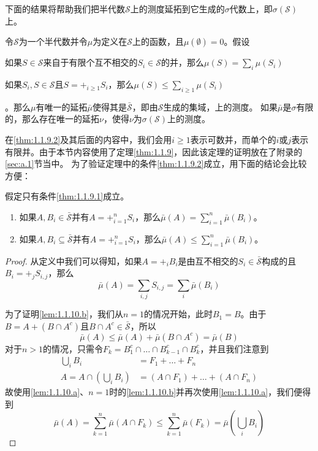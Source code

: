 \documentclass[main.tex]{subfiles}
\begin{document}
下面的结果将帮助我们把半代数\(\mathcal{S}\)上的测度延拓到它生成的\(\sigma\)代数上，即\(\sigma(\mathcal{S})\)上。
\begin{theorem} \label{thm:1.1.9}
	令\(\mathcal{S}\)为一个半代数并令\(\mu\)为定义在\(\mathcal{S}\)上的函数，且\(\mu(\emptyset) = 0\)。假设\begin{enumerate*}
		\item \label{thm:1.1.9.1} 如果\(S \in \mathcal{S}\)来自于有限个互不相交的\(S_i \in \mathcal{S}\)的并，那么\(\mu(S) = \sum_i \mu(S_i)\)
		\item \label{thm:1.1.9.2} 如果\(S_i, S \in \mathcal{S}\)且\(S = +_{i \geq 1} S_i\)，那么\(\mu(S) \leq \sum_{i \geq 1} \allowbreak\mu(S_i)\)
	\end{enumerate*}。那么\(\mu\)有唯一的延拓\(\bar{\mu}\)使得其是\(\bar{\mathcal{S}}\)，即由\(\mathcal{S}\)生成的集域，上的测度。
	如果\(\bar{\mu}\)是\(\sigma\)有限的，那么存在唯一的延拓\(\nu\)，使得\(\nu\)为\(\sigma(\mathcal{S})\)上的测度。
\end{theorem}
在\ref{thm:1.1.9.2}及其后面的内容中，我们会用\(i \geq 1\)表示可数并，而单个的\(i\)或\(j\)表示有限并。由于本节内容使用了定理\ref{thm:1.1.9}，因此该定理的证明放在了附录的\ref{sec:a.1}节当中。
为了验证定理中的条件\ref{thm:1.1.9.2}成立，用下面的结论会比较方便：
\begin{lemma} \label{lem:1.1.10}
	假定只有条件\ref{thm:1.1.9.1}成立。
	\begin{enumerate}[label*=(\alph*)]
		\item \label{lem:1.1.10.a} 如果\(A, B_i \in \bar{\mathcal{S}}\)并有\(A = +_{i=1}^n S_i\)，那么\(\bar{\mu}(A) = \sum_{i=1}^n \bar{\mu}(B_i)\)。
		\item \label{lem:1.1.10.b} 如果\(A, B_i \subseteq \bar{\mathcal{S}}\)并有\(A = +_{i=1}^n S_i\)，那么\(\bar{\mu}(A) \leq \sum_{i=1}^n \bar{\mu}(B_i)\)。
	\end{enumerate}
\end{lemma}
\begin{proof}
	从定义中我们可以得知，如果\(A = +_i B_i\)是由互不相交的\(S_i \in \bar{\mathcal{S}}\)构成的且\(B_i = +_j S_{i,j}\)，那么
	\[\bar{\mu}(A) = \sum_{i,j} S_{i,j} = \sum_{i} \bar{\mu}(B_i) \]

	为了证明\ref{lem:1.1.10.b}，我们从\(n = 1\)的情况开始，此时\(B_1 = B\)。由于\(B = A + (B \cap A^c)\)且\(B \cap A^c \in \bar{\mathcal{S}}\)，所以
	\[\bar{\mu}(A) \leq \bar{\mu}(A) + \bar{\mu}(B \cap A^c) = \bar{\mu}(B)\]
	对于\(n > 1\)的情况，只需令\(F_k = B_1^c \cap \dots \cap B_{k-1}^c \cap B_k^c\)，并且我们注意到
	\[\begin{split}
		\bigcup_i B_i &= F_1 + \dots + F_n\\
		A = A \cap \left(\bigcup_i B_i\right) &= (A \cap F_1) + \dots + (A \cap F_n)
	\end{split}\]
	故使用\ref{lem:1.1.10.a}、\(n = 1\)时的\ref{lem:1.1.10.b}并再次使用\ref{lem:1.1.10.a}，我们便得到
	\[\bar{\mu}(A) = \sum_{k=1}^n \bar{\mu}(A \cap F_k) \leq \sum_{k=1}^n \bar{\mu}(F_k) = \bar{\mu}\left(\bigcup_i B_i\right)\]
\end{proof}
\end{document}
